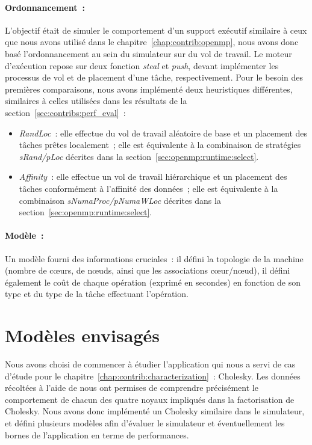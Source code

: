 \paragraph{Ordonnancement~:}
L'objectif était de simuler le comportement d'un support exécutif similaire à ceux que nous avons utilisé dans le chapitre~\ref{chap:contrib:openmp}, nous avons donc basé l'ordonnancement au sein du simulateur sur du vol de travail.
Le moteur d'exécution repose sur deux fonction \emph{steal} et \emph{push}, devant implémenter les processus de vol et de placement d'une tâche, respectivement.
Pour le besoin des premières comparaisons, nous avons implémenté deux heuristiques différentes, similaires à celles utilisées dans les résultats de la section~\ref{sec:contribs:perf_eval}~:
\begin{itemize}
  \item \emph{RandLoc}~: elle effectue du vol de travail aléatoire de base et un placement des tâches prêtes localement~; elle est équivalente à la combinaison de stratégies \emph{sRand/pLoc} décrites dans la section~\ref{sec:openmp:runtime:select}.
  \item \emph{Affinity}~: elle effectue un vol de travail hiérarchique et un placement des tâches conformément à l'affinité des données~; elle est équivalente à la combinaison \emph{sNumaProc/pNumaWLoc} décrites dans la section~\ref{sec:openmp:runtime:select}.
\end{itemize}


\paragraph{Modèle~:}
Un modèle fourni des informations cruciales~: il défini la topologie de la machine (nombre de cœurs, de nœuds, ainsi que les associations cœur/nœud), il défini également le coût de chaque opération (exprimé en secondes) en fonction de son type et du type de la tâche effectuant l'opération.


\section{Modèles envisagés}\label{sec:simulation:modeles}

Nous avons choisi de commencer à étudier l'application qui nous a servi de cas d'étude pour le chapitre~\ref{chap:contrib:characterization}~: Cholesky.
Les données récoltées à l'aide de \outil nous ont permises de comprendre précisément le comportement de chacun des quatre noyaux impliqués dans la factorisation de Cholesky.
Nous avons donc implémenté un Cholesky similaire dans le simulateur, et défini plusieurs modèles afin d'évaluer le simulateur et éventuellement les bornes de l'application en terme de performances.

